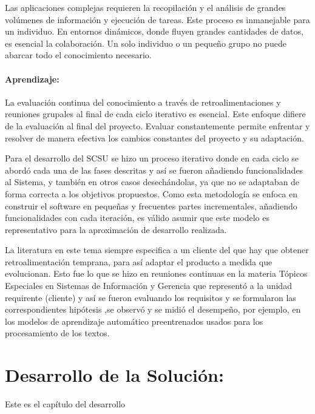 \documentclass[
  10,
  openany]{book}
\begin{document}
Las aplicaciones complejas requieren la recopilación y el análisis de grandes volúmenes de información y ejecución de tareas. Este proceso es inmanejable para un individuo. En entornos dinámicos, donde fluyen grandes cantidades de datos, es esencial la colaboración. Un solo individuo o un pequeño grupo no puede abarcar todo el conocimiento necesario.

\hypertarget{aprendizaje}{%
\subsubsection{\texorpdfstring{\textbf{Aprendizaje:}}{Aprendizaje:}}\label{aprendizaje}}

La evaluación continua del conocimiento a través de retroalimentaciones y reuniones grupales al final de cada ciclo iterativo es esencial. Este enfoque difiere de la evaluación al final del proyecto. Evaluar constantemente permite enfrentar y resolver de manera efectiva los cambios constantes del proyecto y su adaptación.

Para el desarrollo del SCSU se hizo un proceso iterativo donde en cada ciclo se abordó cada una de las fases descritas y así se fueron añadiendo funcionalidades al Sistema, y también en otros casos desechándolas, ya que no se adaptaban de forma correcta a los objetivos propuestos. Como esta metodología se enfoca en construir el software en pequeñas y frecuentes partes incrementales, añadiendo funcionalidades con cada iteración, es válido asumir que este modelo es representativo para la aproximación de desarrollo realizada.

La literatura en este tema siempre especifica a un cliente del que hay que obtener retroalimentación temprana, para así adaptar el producto a medida que evolucionan. Esto fue lo que se hizo en reuniones continuas en la materia Tópicos Especiales en Sistemas de Información y Gerencia que representó a la unidad requirente (cliente) y así se fueron evaluando los requisitos y se formularon las correspondientes hipótesis ,se observó y se midió el desempeño, por ejemplo, en los modelos de aprendizaje automático preentrenados usados para los procesamiento de los textos.

\hypertarget{desarrollo}{%
\chapter{Desarrollo de la Solución:}\label{desarrollo}}

Este es el capítulo del desarrollo
\end{document}
